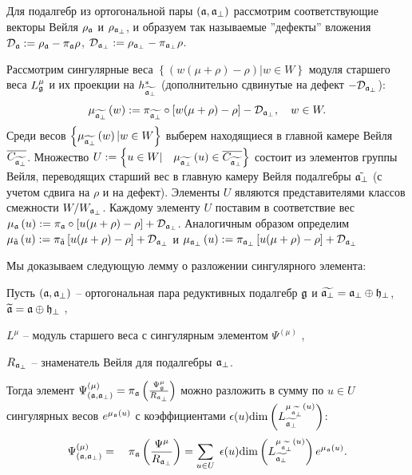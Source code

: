 \documentclass[14pt,autoref,href,facsimile
]{disser}
\begin{document}
Для подалгебр из ортогональной пары  $\left( \mathfrak{a},\mathfrak{a}_{\perp}\right) $ рассмотрим соответствующие векторы Вейля $\rho _{\mathfrak{a}}$ и $\rho _{\mathfrak{a}_{\perp }}$, и образуем так называемые  ''дефекты'' вложения $\mathcal{D}_{\mathfrak{a}}:=\rho _{\mathfrak{a}}-\pi _{\mathfrak{a}}\rho$, $\mathcal{D}_{\mathfrak{a}_{\perp }}:=\rho _{\mathfrak{a}_{\perp }}-\pi_{\mathfrak{a}_{\perp}}\rho$.

Рассмотрим сингулярные веса  $\left\{\left( w(\mu +\rho )-\rho \right)|w  \in W \right\}$  модуля старшего веса  $L_{\mathfrak{g}}^{\mu }$ и их проекции на $h_{\widetilde{\mathfrak{a}_{\perp }}}^{\ast }$ (дополнительно сдвинутые на дефект $-\mathcal{D}_{\mathfrak{a}_{\perp }}$):
\begin{equation*}
\mu _{\widetilde{\af_{\perp }}}\left( w\right) :=\pi _{\widetilde{\frak{%
a}_{\perp }}}\circ\left[ w(\mu +\rho )-\rho \right] -\mathcal{D}_{\af_{\perp
}},\quad w\in W.
\end{equation*}
Среди весов  $\left\{\mu _{\widetilde{\mathfrak{a}_{\perp }}}\left( w\right)|w\in W\right\}$ выберем находящиеся в главной камере Вейля $\overline{C_{\widetilde{\mathfrak{a}_{\perp}}}}$. Множество $U:=\left\{ u\in W|\quad \mu _{\widetilde{\mathfrak{a}_{\perp }}}\left( u\right)
\in \overline{C_{\widetilde{\mathfrak{a}_{\perp }}}}\right\}$ состоит из элементов группы Вейля, переводящих старший вес в главную камеру Вейля подалгебры $\tilde{\mathfrak{a}_{\perp}}$ (с учетом сдвига на $\rho$ и на дефект). Элементы $U$ являются представителями классов смежности $W/W_{\mathfrak{a}_{\perp }}$. 
Каждому элементу  $U$ поставим в соответствие вес $\mu _{\mathfrak{a}}\left( u\right) :=\pi _{\mathfrak{a}}\circ\left[ u(\mu +\rho )-\rho \right] +\mathcal{D}_{\mathfrak{a}_{\perp}}$. Аналогичным образом определим $\mu _{\tilde {\mathfrak{a}}}\left( u\right) :=\pi _{\tilde {\mathfrak{a}}}\left[ u(\mu +\rho )-\rho \right] +\mathcal{D}_{\mathfrak{a}_{\perp}}$ и $\mu _{\mathfrak{a}_{\perp}}\left( u\right) :=\pi _{\mathfrak{a}_{\perp}}\left[ u(\mu +\rho )-\rho \right] +\mathcal{D}_{\mathfrak{a}_{\perp}}$

Мы доказываем следующую лемму о разложении сингулярного элемента:
\begin{lemma}
\label{lemma}
Пусть $\left( \mathfrak{a},\mathfrak{a}_{\perp} \right)$ -- ортогональная пара редуктивных подалгебр $\mathfrak{g}$ и  $\widetilde{\mathfrak{a}_{\perp}}=\mathfrak{a}_{\perp}\oplus \mathfrak{h}_{\perp }$, $\widetilde{\mathfrak{a}}=\mathfrak{a}\oplus\mathfrak{h}_{\perp }$ ,

$L^{\mu }$ -- модуль старшего веса с сингулярным элементом $\Psi ^{\left(\mu \right)}$ ,

$R_{\mathfrak{a}_{\perp }}$ -- знаменатель Вейля для подалгебры $\mathfrak{a}_{\perp }$.

Тогда элемент  $\Psi ^{\left( \mu \right) }_{\left(  \mathfrak{a}, \mathfrak{a}_{\perp} \right)}=\pi _{\mathfrak{a}}\left( \frac{\Psi _{\mathfrak{g}}^{\mu }}{R_{\mathfrak{a}_{\perp }}}\right) $ можно разложить в сумму по  $u\in U$ сингулярных весов $e^{\mu _{\mathfrak{a}}\left( u\right) }$ с коэффициентами $\epsilon (u)\mathrm{\dim}\left( L_{\widetilde{\mathfrak{a}_{\perp}}}^{\mu _{\widetilde{\mathfrak{a}_{\perp}}}\left( u\right) }\right) $:
\begin{equation}
\Psi ^{\left( \mu \right) }_{\left(  \af, \afb \right)}=\quad \pi _{\af}\left( \frac{\Psi^{\mu }}{R_{\af%
_{\perp }}}\right) =\sum_{u\in U}\;\epsilon (u)\mathrm{\dim }
\left( L_{\widetilde{\af_{\perp }}}^{\mu _{%
\widetilde{\af_{\perp }}}\left( u\right) }\right) e^{\mu _{\af}\left( u \right) }.
\end{equation}
\end{lemma}
\end{document}
